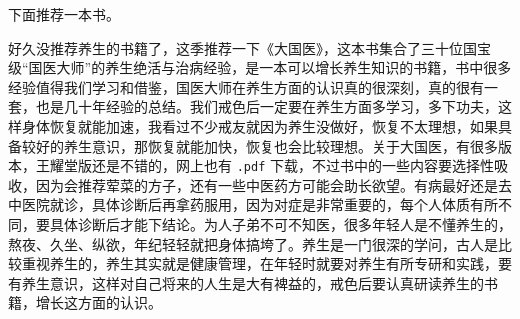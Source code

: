 下面推荐一本书。

\begin{book}
    好久没推荐养生的书籍了，这季推荐一下《大国医》，这本书集合了三十位国宝级“国医大师”的养生绝活与治病经验，是一本可以增长养生知识的书籍，书中很多经验值得我们学习和借鉴，国医大师在养生方面的认识真的很深刻，真的很有一套，也是几十年经验的总结。我们戒色后一定要在养生方面多学习，多下功夫，这样身体恢复就能加速，我看过不少戒友就因为养生没做好，恢复不太理想，如果具备较好的养生意识，那恢复就能加快，恢复也会比较理想。关于大国医，有很多版本，王耀堂版还是不错的，网上也有 \texttt{.pdf} 下载，不过书中的一些内容要选择性吸收，因为会推荐荤菜的方子，还有一些中医药方可能会助长欲望。有病最好还是去中医院就诊，具体诊断后再拿药服用，因为对症是非常重要的，每个人体质有所不同，要具体诊断后才能下结论。为人子弟不可不知医，很多年轻人是不懂养生的，熬夜、久坐、纵欲，年纪轻轻就把身体搞垮了。养生是一门很深的学问，古人是比较重视养生的，养生其实就是健康管理，在年轻时就要对养生有所专研和实践，要有养生意识，这样对自己将来的人生是大有裨益的，戒色后要认真研读养生的书籍，增长这方面的认识。
\end{book}
